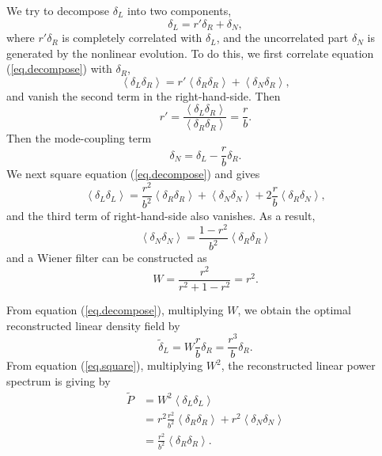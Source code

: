 \documentclass[aps,prd,twocolumn,superscriptaddress,amsfont,amssymb,amsmath,nofootinbib,showpacs,balancelastpage]{revtex4-1}
\begin{document}
We try to decompose $\delta_L$ into two components,
\begin{equation}\label{eq.decompose}
    \delta_L=r'\delta_R+\delta_N,
\end{equation}
where $r'\delta_R$ is completely correlated with $\delta_L$, and the uncorrelated part $\delta_N$ is generated by the nonlinear evolution. To do this, we first correlate equation (\ref{eq.decompose}) with $\delta_R$,
\begin{equation}\label{eq.correlate}
    \left\langle\delta_L\delta_R\right\rangle
    =r'\left\langle\delta_R\delta_R\right\rangle
    +\left\langle\delta_N\delta_R\right\rangle,
\end{equation}
and vanish the second term in the right-hand-side. Then
\begin{equation}
    r'=\frac{\left\langle\delta_L\delta_R\right\rangle}
    {\left\langle\delta_R\delta_R\right\rangle}=\frac{r}{b}.
\end{equation}
Then the mode-coupling term 
\begin{equation}
    \delta_N=\delta_L-\frac{r}{b}\delta_R.
\end{equation}
We next square equation (\ref{eq.decompose}) and gives
\begin{equation}\label{eq.square}
    \left\langle\delta_L\delta_L\right\rangle
    =\frac{r^2}{b^2}\left\langle\delta_R\delta_R\right\rangle
    +\left\langle\delta_N\delta_N\right\rangle
    +2\frac{r}{b}\left\langle\delta_R\delta_N\right\rangle,
\end{equation}
and the third term of right-hand-side also vanishes. As a result,
\begin{equation}
    \left\langle\delta_N\delta_N\right\rangle
    =\frac{1-r^2}{b^2}
    \left\langle\delta_R\delta_R\right\rangle
\end{equation}
and a Wiener filter can be constructed as
\begin{equation}
    W=\frac{r^2}{r^2+1-r^2}=r^2.
\end{equation}

From equation (\ref{eq.decompose}), multiplying $W$, we obtain the optimal reconstructed linear density field by
\begin{equation}
    \tilde\delta_L=W\frac{r}{b}\delta_R=\frac{r^3}{b}\delta_R.
\end{equation}
From equation (\ref{eq.square}), multiplying $W^2$, the reconstructed linear power spectrum is giving by
\begin{equation}
\begin{aligned}
    \tilde{P}&=W^2\left\langle\delta_L\delta_L\right\rangle  \\
    &=r^2\frac{r^2}{b^2}\left\langle\delta_R\delta_R\right\rangle +r^2\left\langle\delta_N\delta_N\right\rangle  \\
    &=\frac{r^2}{b^2}\left\langle\delta_R\delta_R\right\rangle.
\end{aligned}
\end{equation}
\end{document}
